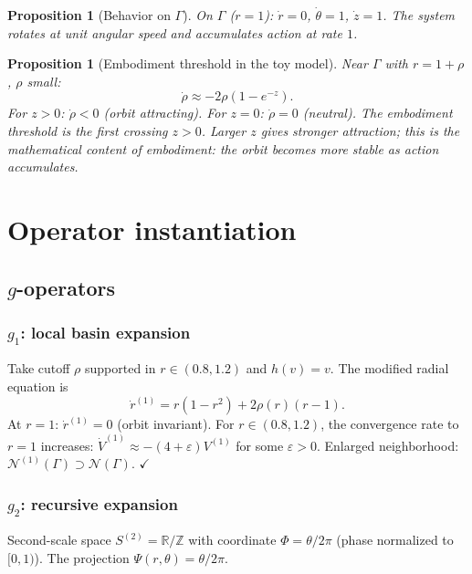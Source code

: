 \documentclass[reqno]{amsart}
\numberwithin{equation}{section}
\theoremstyle{plain}
\newtheorem{proposition}[theorem]{Proposition}
\theoremstyle{definition}
\theoremstyle{remark}
\newcommand{\R}{\mathbb{R}}
\newcommand{\Orb}{\Gamma}
\newcommand{\cN}{\mathcal{N}}
\newcommand{\eps}{\varepsilon}
\begin{document}
\begin{proposition}[Behavior on $\Orb$]\label{prop:onorbit}
On $\Orb$ ($r=1$): $\dot r=0$, $\dot\theta=1$, $\dot z=1$.
The system rotates at unit angular speed and accumulates action
at rate $1$.
\end{proposition}

\begin{proposition}[Embodiment threshold in the toy model]\label{prop:threshold}
Near $\Orb$ with $r=1+\rho$, $\rho$ small:
\[
  \dot\rho \approx -2\rho(1-e^{-z}).
\]
For $z>0$: $\dot\rho<0$ (orbit attracting). For $z=0$: $\dot\rho=0$
(neutral). The embodiment threshold is the first crossing $z>0$.
Larger $z$ gives stronger attraction; this is the mathematical
content of embodiment: the orbit becomes more stable as action
accumulates.
\end{proposition}

\section{Operator instantiation}\label{sec:operators}

\subsection{\texorpdfstring{$g$}{g}-operators}

\subsubsection{$g_1$: local basin expansion}

Take cutoff $\rho$ supported in $r\in(0.8,1.2)$ and $h(v)=v$.
The modified radial equation is
\[
  \dot r^{(1)} = r(1-r^2) + 2\rho(r)(r-1).
\]
At $r=1$: $\dot r^{(1)}=0$ (orbit invariant). For $r\in(0.8,1.2)$,
the convergence rate to $r=1$ increases:
$\dot V^{(1)}\approx-(4+\eps)V^{(1)}$ for some $\eps>0$.
Enlarged neighborhood: $\cN^{(1)}(\Orb)\supset\cN(\Orb)$. $\checkmark$

\subsubsection{$g_2$: recursive expansion}

Second-scale space $S^{(2)}=\R/\mathbb{Z}$ with coordinate
$\Phi=\theta/2\pi$ (phase normalized to $[0,1)$).
The projection $\Psi(r,\theta)=\theta/2\pi$.
\end{document}
